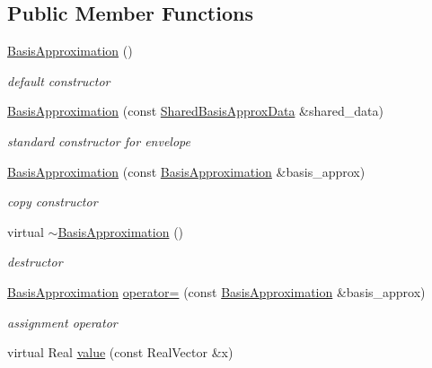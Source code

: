 \subsection*{Public Member Functions}
\begin{DoxyCompactItemize}
\item 
\hyperlink{classPecos_1_1BasisApproximation_a0f079f90460b078cfd553c20f2c33642}{Basis\+Approximation} ()
\begin{DoxyCompactList}\small\item\em default constructor \end{DoxyCompactList}\item 
\hyperlink{classPecos_1_1BasisApproximation_acc50081d826259352411322c65e1c2f2}{Basis\+Approximation} (const \hyperlink{classPecos_1_1SharedBasisApproxData}{Shared\+Basis\+Approx\+Data} \&shared\+\_\+data)
\begin{DoxyCompactList}\small\item\em standard constructor for envelope \end{DoxyCompactList}\item 
\hyperlink{classPecos_1_1BasisApproximation_afe92f553e027ee28cbb82dfb03ae5406}{Basis\+Approximation} (const \hyperlink{classPecos_1_1BasisApproximation}{Basis\+Approximation} \&basis\+\_\+approx)
\begin{DoxyCompactList}\small\item\em copy constructor \end{DoxyCompactList}\item 
virtual \hyperlink{classPecos_1_1BasisApproximation_ab820bed8a6adfca8d7888b6e17320c5e}{$\sim$\+Basis\+Approximation} ()
\begin{DoxyCompactList}\small\item\em destructor \end{DoxyCompactList}\item 
\hyperlink{classPecos_1_1BasisApproximation}{Basis\+Approximation} \hyperlink{classPecos_1_1BasisApproximation_a9f1c4e77a7c75f4004fa2e9af780a20e}{operator=} (const \hyperlink{classPecos_1_1BasisApproximation}{Basis\+Approximation} \&basis\+\_\+approx)
\begin{DoxyCompactList}\small\item\em assignment operator \end{DoxyCompactList}\item 
virtual Real \hyperlink{classPecos_1_1BasisApproximation_a7bc9dcdf32fc46f97e286268c1ac51b0}{value} (const Real\+Vector \&x)\label{classPecos_1_1BasisApproximation_a7bc9dcdf32fc46f97e286268c1ac51b0}


\end{DoxyCompactItemize}
